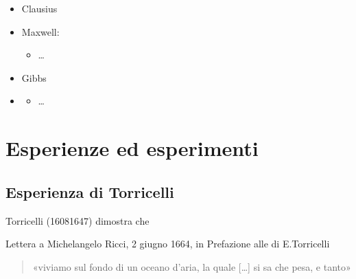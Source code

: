 \documentclass[letterpaper,10pt,italian]{jupyterBook}
\begin{document}
\sphinxAtStartPar
{}
\begin{itemize}
\item {} 
\sphinxAtStartPar
Clausius

\item {} 
\sphinxAtStartPar
Maxwell:
\begin{itemize}
\item {} 
\sphinxAtStartPar
…

\end{itemize}

\item {} 
\sphinxAtStartPar
Gibbs

\item {} 
\sphinxAtStartPar
{}
\begin{itemize}
\item {} 
\sphinxAtStartPar
…

\end{itemize}

\end{itemize}



\sphinxstepscope


\section{Esperienze ed esperimenti}
\label{\detokenize{ch/thermodynamics/foundation-experiments:esperienze-ed-esperimenti}}\label{\detokenize{ch/thermodynamics/foundation-experiments:physics-hs-thermodynamics-foundation-experiments}}\label{\detokenize{ch/thermodynamics/foundation-experiments::doc}}

\subsection{Esperienza di Torricelli}
\label{\detokenize{ch/thermodynamics/foundation-experiments:esperienza-di-torricelli}}\label{\detokenize{ch/thermodynamics/foundation-experiments:physics-hs-thermodynamics-foundation-experiments-torricelli}}
\sphinxAtStartPar
Torricelli (1608\sphinxhyphen{}1647) dimostra che%
\begin{footnote}[1]\sphinxAtStartFootnote
Lettera a Michelangelo Ricci, 2 giugno 1664, in Prefazione alle  di E.Torricelli
%
\end{footnote}
\begin{quote}

\sphinxAtStartPar
«viviamo sul fondo di un oceano d’aria, la quale {[}…{]} si sa che pesa, e tanto»
\end{quote}
\end{document}
